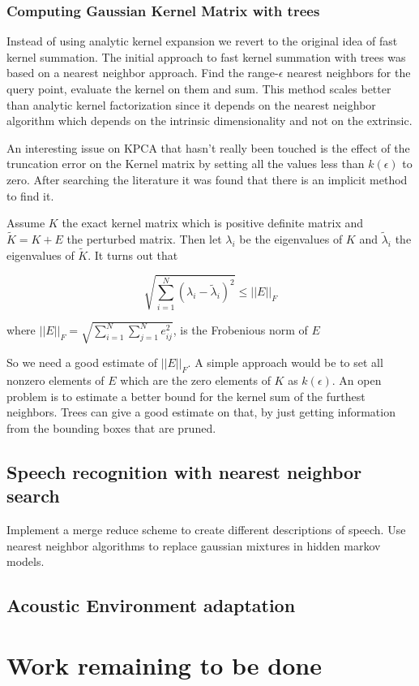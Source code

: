 \documentclass[12pt,letterpaper,doublespaced,ETD,dvips,proposal]{gtthesis}
\begin{document}
\begin{Body}
\subsubsection{Computing Gaussian Kernel Matrix with trees}
Instead of using analytic kernel expansion we revert to the original
idea of fast kernel summation. The initial approach to fast kernel
summation with trees was based on a nearest neighbor approach. Find
the range-$\epsilon$ nearest neighbors for the query point, evaluate
the kernel on them and sum. This method scales better than analytic
kernel factorization since it depends on the nearest neighbor
algorithm which depends on the intrinsic dimensionality and not on
the extrinsic.

An interesting issue on KPCA that hasn't really been touched is the
effect of the truncation error on the Kernel matrix by setting all
the values less than $k(\epsilon)$ to zero. After searching the
literature it was found that there is an implicit method to find it.

Assume $K$ the exact kernel matrix which is positive definite matrix
and $\tilde{K}=K+E$ the perturbed matrix. Then let $\lambda_i$ be
the eigenvalues of $K$ and $\tilde{\lambda}_i$ the eigenvalues of
$\tilde{K}$. It turns out that

\begin{equation}
\sqrt{\sum_{i=1}^{N}(\lambda_i-\tilde{\lambda}_i)^2}\leq ||E||_F
\end{equation}

where $||E||_F=\sqrt{\sum_{i=1}^{N}\sum_{j=1}^{N}e_{ij}^2}$, is the
Frobenious norm of $E$

So we need a good estimate of $||E||_F$. A simple approach would be
to set all nonzero elements of $E$ which are the zero elements of
$K$ as $k(\epsilon)$.  An open problem is to estimate a better bound
for the kernel sum of the furthest neighbors. Trees can give  a good
estimate on that, by just getting information from the bounding
boxes that are pruned.


\subsection{Speech recognition with nearest neighbor search}
Implement a merge reduce scheme to create different descriptions of
speech. Use nearest neighbor algorithms to replace gaussian mixtures
in hidden markov models.

\subsection{Acoustic Environment adaptation}

\section{Work remaining to be done}
\label{remains}

\end{Body}

\begin{EndMatter}


\index %
\end{EndMatter}
\end{document}
